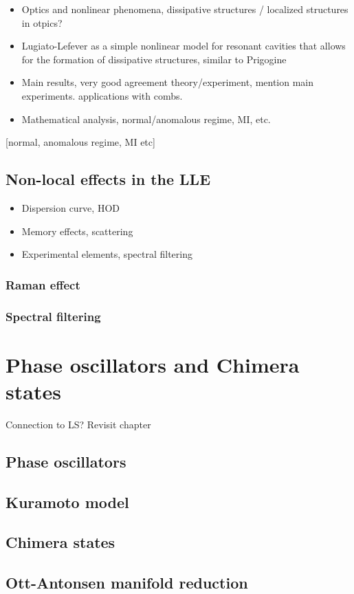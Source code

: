\begin{itemize}
    \item Optics and nonlinear phenomena, dissipative structures / localized structures in otpics?
    \item Lugiato-Lefever as a simple nonlinear model for resonant cavities that allows for the
    formation of dissipative structures, similar to Prigogine
    \item Main results, very good agreement theory/experiment, mention main experiments.
    applications with combs.
    \item Mathematical analysis, normal/anomalous regime, MI, etc.
\end{itemize}

[normal, anomalous regime, MI etc]

\subsection{Non-local effects in the LLE}

\begin{itemize}
    \item Dispersion curve, HOD
    \item Memory effects, scattering
    \item Experimental elements, spectral filtering
\end{itemize}

\subsubsection{Raman effect}
\subsubsection{Spectral filtering}

\section{Phase oscillators and Chimera states}
Connection to LS?  Revisit chapter
\subsection{Phase oscillators}
\label{sec:phase_oscillators}

\subsection{Kuramoto model}

\subsection{Chimera states}

\subsection{Ott-Antonsen manifold reduction}